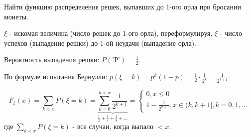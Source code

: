 \begin{exmp}
	Найти функцию распределения решек, выпавших до 1-ого орла при бросании монеты.
	
	$\xi$ - искомая величина (число решек до 1-ого орла), переформулируя,  $\xi$ - число успехов (выпадение решки) до 1-ой неудачи (выпадение орла).
	
	Вероятность выпадения решки: $P(\text{'Р'}) = \frac{1}{2}$.
	
	По формуле испытания Бернулли: $p(\xi = k) = p^k(1-p) = \frac{1}{2} \cdot \frac{1}{2^k} = \frac{1}{2^{k+1}}$.
	\begin{figure}[H]
	\end{figure}
	\[ F_{\xi}(x) = \sum_{k < x} P(\xi = k) = \underbrace{\sum_{k=0}^{k<x} \frac{1}{2^{k+1}}}_{\frac{1}{2} + \frac{1}{4} + \frac{1}{8} + \dots} =
	\begin{cases}
	0, x \le 0 \\
	1 - \frac{1}{2^{k+1}}, x \in (k, k+1], k = 0,1,\dots
	\end{cases}
	\]
	где $\sum_{k < x} P(\xi = k)$ - все случаи, когда выпало $<x$.
	\begin{figure}[H]
	\end{figure}
\end{exmp}
